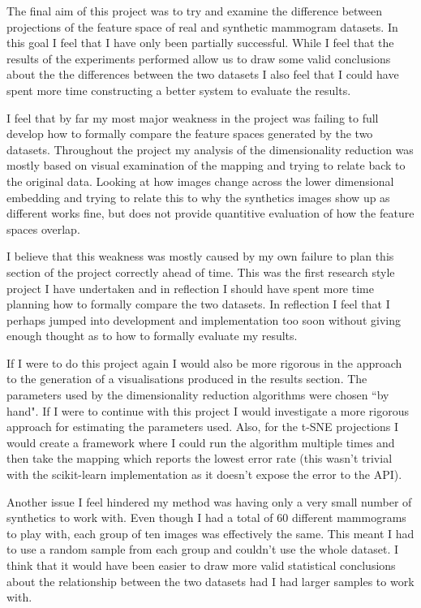 The final aim of this project was to try and examine the difference between projections of the feature space of real and synthetic mammogram datasets. In this goal I feel that I have only been partially successful. While I feel that the results of the experiments performed allow us to draw some valid conclusions about the the differences between the two datasets I also feel that I could have spent more time constructing a better system to evaluate the results.

I feel that by far my most major weakness in the project was failing to full develop how to formally compare the feature spaces generated by the two datasets. Throughout the project my analysis of the dimensionality reduction was mostly based on visual examination of the mapping and trying to relate back to the original data. Looking at how images change across the lower dimensional embedding and trying to relate this to why the synthetics images show up as different works fine, but does not provide quantitive evaluation of how the feature spaces overlap.

I believe that this weakness was mostly caused by my own failure to plan this section of the project correctly ahead of time. This was the first research style project I have undertaken and in reflection I should have spent more time planning how to formally compare the two datasets. In reflection I feel that I perhaps jumped into development and implementation too soon without giving enough thought as to how to formally evaluate my results. 

If I were to do this project again I would also be more rigorous in the approach to the generation of a visualisations produced in the results section. The parameters used by the dimensionality reduction algorithms were chosen ``by hand". If I were to continue with this project I would investigate a more rigorous approach for estimating the parameters used. Also, for the t-SNE projections I would create a framework where I could run the algorithm multiple times and then take the mapping which reports the lowest error rate (this wasn't trivial with the scikit-learn implementation as it doesn't expose the error to the API).

Another issue I feel hindered my method was having only a very small number of synthetics to work with. Even though I had a total of 60 different mammograms to play with, each group of ten images was effectively the same. This meant I had to use a random sample from each group and couldn't use the whole dataset. I think that it would have been easier to draw more valid statistical conclusions about the relationship between the two datasets had I had larger samples to work with.

